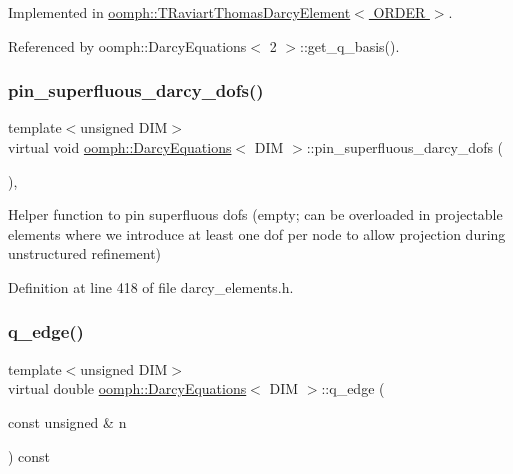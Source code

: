 Implemented in \hyperlink{classoomph_1_1TRaviartThomasDarcyElement_a26fd22715cc5a27e55bca5d760b822e0}{oomph\+::\+T\+Raviart\+Thomas\+Darcy\+Element$<$ O\+R\+D\+E\+R $>$}.



Referenced by oomph\+::\+Darcy\+Equations$<$ 2 $>$\+::get\+\_\+q\+\_\+basis().

\mbox{\label{classoomph_1_1DarcyEquations_a7a98829567782b4973208317ab7bcd50}} 
\subsubsection{\texorpdfstring{pin\+\_\+superfluous\+\_\+darcy\+\_\+dofs()}{pin\_superfluous\_darcy\_dofs()}}
{\footnotesize\ttfamily template$<$unsigned D\+IM$>$ \\
virtual void \hyperlink{classoomph_1_1DarcyEquations}{oomph\+::\+Darcy\+Equations}$<$ D\+IM $>$\+::pin\+\_\+superfluous\+\_\+darcy\+\_\+dofs (\begin{DoxyParamCaption}{ }\end{DoxyParamCaption})\hspace{0.3cm}{\ttfamily [inline]}, {\ttfamily [virtual]}}



Helper function to pin superfluous dofs (empty; can be overloaded in projectable elements where we introduce at least one dof per node to allow projection during unstructured refinement) 



Definition at line 418 of file darcy\+\_\+elements.\+h.

\mbox{\label{classoomph_1_1DarcyEquations_ab66fb06e7f90655229b0eb2b96cf3f1e}} 
\subsubsection{\texorpdfstring{q\+\_\+edge()}{q\_edge()}}
{\footnotesize\ttfamily template$<$unsigned D\+IM$>$ \\
virtual double \hyperlink{classoomph_1_1DarcyEquations}{oomph\+::\+Darcy\+Equations}$<$ D\+IM $>$\+::q\+\_\+edge (\begin{DoxyParamCaption}\item[{const unsigned \&}]{n }\end{DoxyParamCaption}) const\hspace{0.3cm}{\ttfamily [pure virtual]}}



